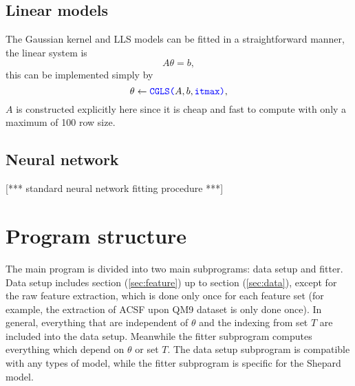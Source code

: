 \documentclass[12pt]{article}
\def\att{                    %
        \marginpar[ \hspace*{\fill} \raisebox{-0.2em}{\rule{2mm}{1.2em}} ]
        {\raisebox{-0.2em}{\rule{2mm}{1.2em}} }
        }
\def\at#1{[*** \att #1 ***]}  %
\begin{document}
\subsection{Linear models}
The Gaussian kernel and LLS models can be fitted in a straightforward manner, the linear system is
\begin{equation}
	A \theta = b,
\end{equation}
this can be implemented simply by
\begin{equation*}
	\theta \leftarrow \codeword{CGLS(}A, b,\codeword{itmax)},
\end{equation*}
$A$ is constructed explicitly here since it is cheap and fast to compute with only a maximum of 100 row size.

\subsection{Neural network}
\at{standard neural network fitting procedure}


\section{Program structure}
The main program is divided into two main subprograms: data setup and fitter. Data setup includes section (\ref{sec:feature}) up to section (\ref{sec:data}), except for the raw feature extraction, which is done only once for each feature set (for example, the extraction of ACSF upon QM9 dataset is only done once). In general, everything that are independent of $\theta$ and the indexing from set $T$ are included into the data setup. Meanwhile the fitter subprogram computes everything which depend on $\theta$ or set $T$. The data setup subprogram is compatible with any types of model, while the fitter subprogram is specific for the Shepard model.
\end{document}
